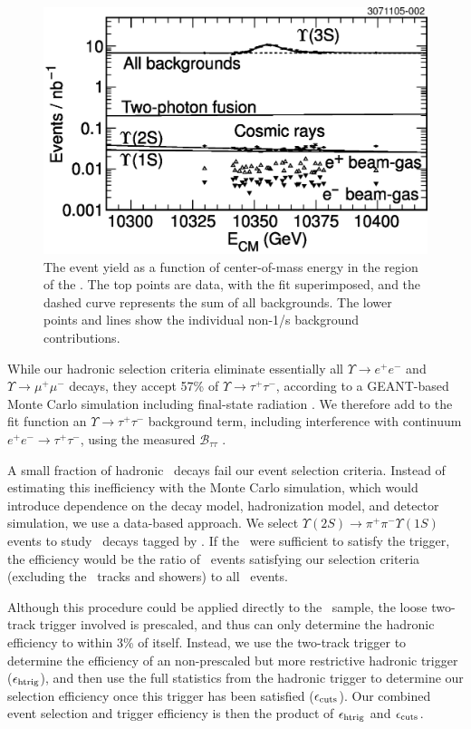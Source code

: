 \documentclass[aps,prd,preprint,superscriptaddress,tightenlines,nofootinbib]{revtex4}
\begin{document}
\begin{figure}
  \includegraphics[width=0.5\linewidth]{backgrounds}
  \caption{\label{fig:backgrounds} The event yield as a function of
center-of-mass energy in the region of the \usss.  The top points are
data, with the fit superimposed, and the dashed curve represents the
sum of all backgrounds.  The lower points and lines show the
individual non-1/s background contributions.}
\end{figure}

While our hadronic selection criteria eliminate essentially all
$\Upsilon \to e^+e^-$ and $\Upsilon \to \mu^+\mu^-$ decays, they
accept 57\% of $\Upsilon \to \tau^+\tau^-$, according to a GEANT-based
Monte Carlo simulation \cite{mc} including final-state radiation
\cite{photos}.  We therefore add to the fit function an $\Upsilon
\to \tau^+\tau^-$ background term, including interference with
continuum $e^+e^- \to \tau^+\tau^-$, using the measured ${\mathcal
B}_{\tau\tau}$ \cite{jean}.

A small fraction of hadronic \ups\ decays fail our event selection
criteria.  Instead of estimating this inefficiency with the Monte
Carlo simulation, which would introduce dependence on the decay model,
hadronization model, and detector simulation, we use a data-based
approach.  We select $\Upsilon(2S) \to \pi^+\pi^- \Upsilon(1S)$ events
to study \us\ decays tagged by \pipi.  If the \pipi\ were sufficient
to satisfy the trigger, the efficiency would be the ratio of \us\
events satisfying our selection criteria (excluding the \pipi\ tracks
and showers) to all \us\ events.

Although this procedure could be applied directly to the \uss\ sample,
the loose two-track trigger involved is prescaled, and thus can only
determine the hadronic efficiency to within 3\% of itself.  Instead,
we use the two-track trigger to determine the efficiency of an
non-prescaled but more restrictive hadronic trigger ($\epsilon_{\mbox{\scriptsize htrig}}$), and
then use the full statistics from the hadronic trigger to determine
our selection efficiency once this trigger has been satisfied
($\epsilon_{\mbox{\scriptsize cuts}}$).  Our combined event selection and trigger efficiency is
then the product of $\epsilon_{\mbox{\scriptsize htrig}}$ and $\epsilon_{\mbox{\scriptsize cuts}}$.
\end{document}
